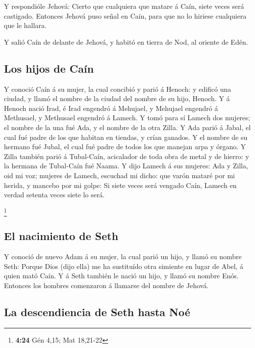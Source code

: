  Y respondióle Jehová: Cierto que cualquiera que matare á
Caín, siete veces será castigado. Entonces Jehová puso señal en Caín,
para que no lo hiriese cualquiera que le hallara.

 Y salió Caín de delante de Jehová, y habitó en tierra de
Nod, al oriente de Edén.

\hypertarget{los-hijos-de-cauxedn}{%
\subsection{Los hijos de Caín}\label{los-hijos-de-cauxedn}}

 Y conoció Caín á su mujer, la cual concibió y parió á
Henoch: y edificó una ciudad, y llamó el nombre de la ciudad del nombre
de su hijo, Henoch.  Y á Henoch nació Irad, é Irad engendró
á Mehujael, y Mehujael engendró á Methusael, y Methusael engendró á
Lamech.  Y tomó para sí Lamech dos mujeres; el nombre de la
una fué Ada, y el nombre de la otra Zilla.  Y Ada parió á
Jabal, el cual fué padre de los que habitan en tiendas, y crían ganados.
 Y el nombre de su hermano fué Jubal, el cual fué padre de
todos los que manejan arpa y órgano.  Y Zilla también parió
á Tubal-Caín, acicalador de toda obra de metal y de hierro: y la hermana
de Tubal-Caín fué Naama.  Y dijo Lamech á sus mujeres: Ada
y Zilla, oid mi voz; mujeres de Lamech, escuchad mi dicho: que varón
mataré por mi herida, y mancebo por mi golpe:  Si siete
veces será vengado Caín, Lamech en verdad setenta veces siete lo será.

\footnote{\textbf{4:24} Gén 4,15; Mat 18,21-22}

\hypertarget{el-nacimiento-de-seth}{%
\subsection{El nacimiento de Seth}\label{el-nacimiento-de-seth}}

 Y conoció de nuevo Adam á su mujer, la cual parió un hijo,
y llamó su nombre Seth: Porque Dios (dijo ella) me ha sustituído otra
simiente en lugar de Abel, á quien mató Caín.  Y á Seth
también le nació un hijo, y llamó su nombre Enós. Entonces los hombres
comenzaron á llamarse del nombre de Jehová.

\hypertarget{la-descendiencia-de-seth-hasta-nouxe9}{%
\subsection{La descendiencia de Seth hasta
Noé}\label{la-descendiencia-de-seth-hasta-nouxe9}}

